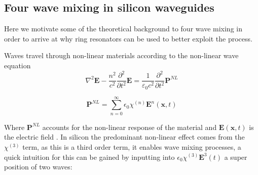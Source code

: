
\subsection{Four wave mixing in silicon waveguides} \label{FWMSECTION}
Here we motivate some of the theoretical background to four wave mixing in order to arrive at why ring resonators can be used to better exploit the process. 

Waves travel through non-linear materials according to the non-linear wave equation\cite{boyd_nonlinear_2013}
\begin{equation}
\nabla^2 \mathbf{E} - \frac{n^2}{c^2}\frac{\partial^2}{\partial t^2}\mathbf{E}
= \frac{1}{\varepsilon_0 c^2}\frac{\partial^2}{\partial t^2}\mathbf{P}^{NL}
\end{equation}

\begin{equation} \label{polEqn}
\mathbf{P}^{NL} =\sum^\infty_{n=0} \epsilon_0\chi^{(n)}\mathbf{E}^n(\mathbf{x	},t)
\end{equation}

Where $\mathbf{P}^{NL}$ accounts for the non-linear response of the material and $\mathbf{E}(\mathbf{x},t)$ is the electric field . In silicon the predominant non-linear effect comes from the $\chi^{(3)}$ term, as this is a third order term, it enables wave mixing processes, a quick intuition for this can be gained by inputting into $ \epsilon_0\chi^{(3)}\mathbf{E}^3(t)$ a super position of two waves:


